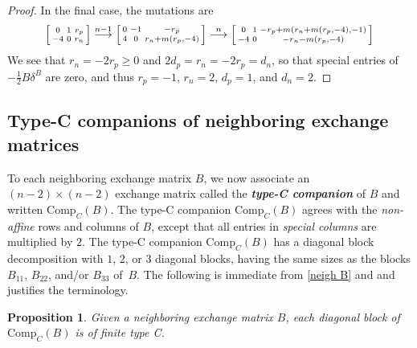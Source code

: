 \documentclass{amsart}
\newtheorem{proposition}{Proposition}[section]
\theoremstyle{definition}
\theoremstyle{remark}
\numberwithin{equation}{section}
\newcommand{\newword}[1]{\textbf{\emph{#1}}}
\newcommand{\0}{{\mathbf{0}}}
\newcommand{\Comp}{\mathrm{Comp}_C}
\begin{document}
\begin{proof}
In the final case, the mutations are
\[\begin{bsmallmatrix*}
0 & 1 & r_p\\
-4 & 0 &r_n
\end{bsmallmatrix*}\overset{n-1}{\longrightarrow} 
\begin{bsmallmatrix*}
0 & -1 & -r_p\\
4 & 0 &r_n+m(r_p,-4)
\end{bsmallmatrix*}\overset{n}{\longrightarrow} 
\begin{bsmallmatrix*}
0 & 1 &-r_p+m(r_n+m(r_p,-4),-1)\\
-4 & 0 &-r_n-m(r_p,-4)
\end{bsmallmatrix*}
\]
We see that $r_n=-2r_p\ge0$ and $2d_p=r_n=-2r_p=d_n$, so that special entries of~$-\frac12B\delta^B$ are zero, and thus $r_p=-1$, $r_n=2$, $d_p=1$, and $d_n=2$.
\end{proof}

\subsection{Type-C companions of neighboring exchange matrices}
To each neighboring exchange matrix $B$, we now associate an $(n-2)\times(n-2)$ exchange matrix called the \newword{type-C companion} of $B$ and written $\Comp(B)$.
The type-C companion $\Comp(B)$ agrees with the \emph{non-affine} rows and columns of $B$, except that all entries in \emph{special columns} are multiplied by $2$.
The type-C companion $\Comp(B)$ has a diagonal block decomposition with $1$, $2$, or $3$ diagonal blocks, having the same sizes as the blocks $B_{11}$, $B_{22}$, and/or $B_{33}$ of~$B$.
The following  is immediate from \cref{neigh B} and \cite[Proposition~3.3]{NakanishiStella} and justifies the terminology.

\begin{proposition}\label{Comp is C}
Given a neighboring exchange matrix $B$, each diagonal block of $\Comp(B)$ is of finite type C.
\end{proposition}
%
\end{document}
